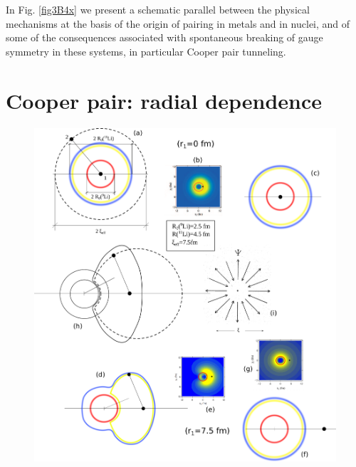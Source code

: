 \begin{subappendices}
In Fig. \ref{fig3B4x} we present a schematic parallel between the physical mechanisms at the basis of the origin of pairing in metals and in nuclei, and of some of the consequences associated with spontaneous breaking of gauge symmetry in these systems, in particular Cooper pair tunneling.  
\section{Cooper pair: radial dependence}
  \begin{figure}
  	\centerline{\includegraphics*[width=15cm,angle=0	]{nutshell/figs/Fig3B1}}
  	\caption{}\label{fig3B1}
  \end{figure}

\end{subappendices}

